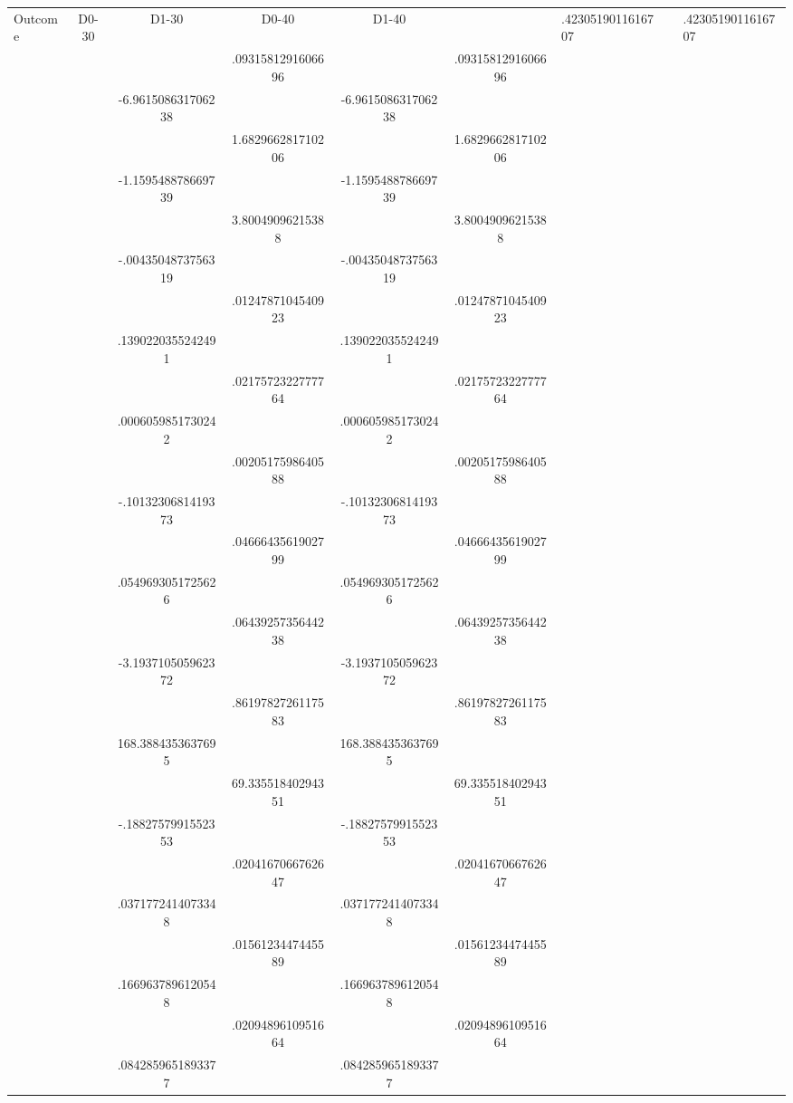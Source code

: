 \begin{tabular}{l c c c c c}
\toprule
Outcome & D0-30 & D1-30 & D0-40 & D1-40 &  & .4230519011616707 &  & .4230519011616707 \\
    & &  & .0931581291606696 &  & .0931581291606696 \\
 &  & -6.961508631706238 &  & -6.961508631706238 \\
    & &  & 1.682966281710206 &  & 1.682966281710206 \\
 &  & -1.159548878669739 &  & -1.159548878669739 \\
    & &  & 3.80049096215388 &  & 3.80049096215388 \\
 &  & -.0043504873756319 &  & -.0043504873756319 \\
    & &  & .0124787104540923 &  & .0124787104540923 \\
 &  & .1390220355242491 &  & .1390220355242491 \\
    & &  & .0217572322777764 &  & .0217572322777764 \\
 &  & .0006059851730242 &  & .0006059851730242 \\
    & &  & .0020517598640588 &  & .0020517598640588 \\
 &  & -.1013230681419373 &  & -.1013230681419373 \\
    & &  & .0466643561902799 &  & .0466643561902799 \\
 &  & .0549693051725626 &  & .0549693051725626 \\
    & &  & .0643925735644238 &  & .0643925735644238 \\
 &  & -3.193710505962372 &  & -3.193710505962372 \\
    & &  & .8619782726117583 &  & .8619782726117583 \\
 &  & 168.3884353637695 &  & 168.3884353637695 \\
    & &  & 69.33551840294351 &  & 69.33551840294351 \\
 &  & -.1882757991552353 &  & -.1882757991552353 \\
    & &  & .0204167066762647 &  & .0204167066762647 \\
 &  & .0371772414073348 &  & .0371772414073348 \\
    & &  & .0156123447445589 &  & .0156123447445589 \\
 &  & .1669637896120548 &  & .1669637896120548 \\
    & &  & .0209489610951664 &  & .0209489610951664 \\
 &  & .0842859651893377 &  & .0842859651893377 \\

\end{tabular}
